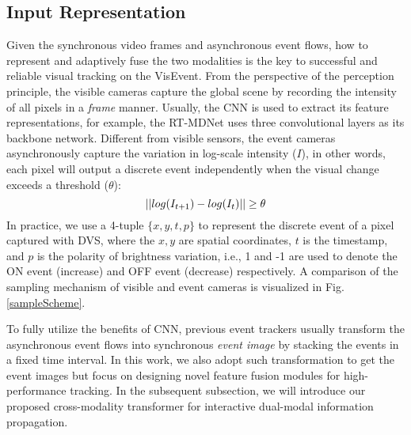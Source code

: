 \documentclass[journal]{IEEEtran}
\begin{document}
\subsection{Input Representation}  \label{InputRepresent} 

Given the synchronous video frames and asynchronous event flows, how to represent and adaptively fuse the two modalities is the key to successful and reliable visual tracking on the VisEvent. From the perspective of the perception principle, the visible cameras capture the global scene by recording the intensity of all pixels in a \emph{frame} manner. Usually, the CNN is used to extract its feature representations, for example, the RT-MDNet \cite{Jung_2018_ECCV} uses three convolutional layers as its backbone network. Different from visible sensors, the event cameras asynchronously capture the variation in log-scale intensity ($I$), in other words, each pixel will output a discrete event independently when the visual change exceeds a threshold ($\theta$): 
\begin{equation}
\small 
||log(I_{t+1}) - log(I_t)|| \geq \theta
\end{equation}
In practice, we use a 4-tuple $\{x, y, t, p\}$ to represent the discrete event of a pixel captured with DVS, where the $x, y$ are spatial coordinates, $t$ is the timestamp, and $p$ is the polarity of brightness variation, i.e., 1 and -1 are used to denote the ON event (increase) and OFF event (decrease) respectively. A comparison of the sampling mechanism of visible and event cameras is visualized in Fig. \ref{sampleScheme}. 


To fully utilize the benefits of CNN, previous event trackers \cite{ramesh2018eventlong, chen2019asynchronouseventtrack, chen2020eventTrack} usually transform the asynchronous event flows into synchronous \emph{event image} by stacking the events in a fixed time interval. In this work, we also adopt such transformation to get the event images but focus on designing novel feature fusion modules for high-performance tracking. In the subsequent subsection, we will introduce our proposed cross-modality transformer for interactive dual-modal information propagation.  
\end{document}
